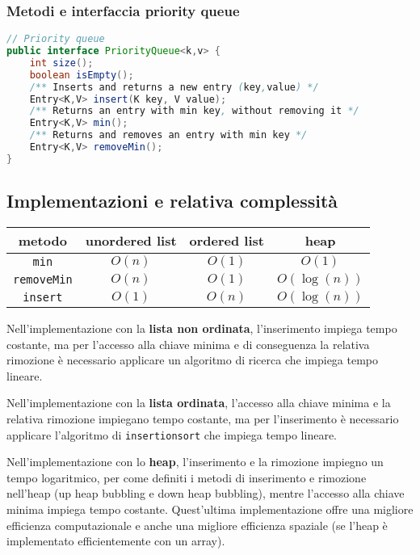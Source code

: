 \documentclass[a4paper]{article}
\begin{document}
\subsubsection*{Metodi e interfaccia priority queue}
\begin{lstlisting}[language=Java]
// Priority queue
public interface PriorityQueue<k,v> {
	int size();
	boolean isEmpty();
	/** Inserts and returns a new entry (key,value) */
	Entry<K,V> insert(K key, V value);
	/** Returns an entry with min key, without removing it */
	Entry<K,V> min();
	/** Returns and removes an entry with min key */
	Entry<K,V> removeMin();
}
\end{lstlisting}

\subsection{Implementazioni e relativa complessità}
\begin{center}
	\begin{tabular}{c | c | c | c}
		\textbf{metodo} & \textbf{unordered list} & \textbf{ordered list} & \textbf{heap} \\
		\toprule
		\verb|min| & \(O(n)\) & \(O(1)\) & \(O(1)\) \\
		\midrule
		\verb|removeMin| & \(O(n)\) & \(O(1)\) & \(O(\log(n))\) \\
		\midrule
		\verb|insert| & \(O(1)\) & \(O(n)\) & \(O(\log(n))\) \\
		\bottomrule
	\end{tabular}
\end{center}

Nell'implementazione con la \textbf{lista non ordinata}, l'inserimento impiega tempo costante, ma per l'accesso alla chiave minima
e di conseguenza la relativa rimozione è necessario applicare un algoritmo di ricerca che impiega tempo lineare.

Nell'implementazione con la \textbf{lista ordinata}, l'accesso alla chiave minima e la relativa rimozione impiegano tempo costante,
ma per l'inserimento è necessario applicare l'algoritmo di \verb|insertionsort| che impiega tempo lineare.

Nell'implementazione con lo \textbf{heap}, l'inserimento e la rimozione impiegno un tempo logaritmico, per come definiti i metodi
di inserimento e rimozione nell'heap (up heap bubbling e down heap bubbling), mentre l'accesso alla chiave minima impiega tempo
costante. Quest'ultima implementazione offre una migliore efficienza computazionale e anche una migliore efficienza spaziale (se
l'heap è implementato efficientemente con un array).
\end{document}
